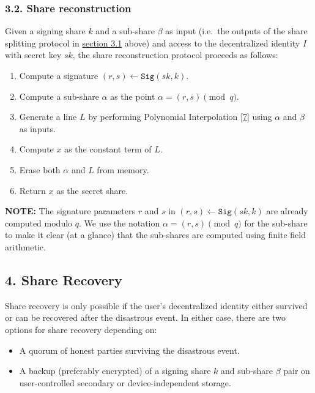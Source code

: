 \documentclass[
]{article}
\providecommand{\tightlist}{%
  \setlength{\itemsep}{0pt}\setlength{\parskip}{0pt}}
\begin{document}
\hypertarget{share-reconstruction}{%
\subsubsection{3.2. Share reconstruction}\label{share-reconstruction}}

Given a signing share \(k\) and a sub-share \(\beta\) as input (i.e.~the
outputs of the share splitting protocol in
\protect\hyperlink{share-splitting}{section 3.1} above) and access to
the decentralized identity \(I\) with secret key \(sk\), the share
reconstruction protocol proceeds as follows:

\begin{enumerate}
\def\labelenumi{\arabic{enumi}.}
\tightlist
\item
  Compute a signature \((r, s) \leftarrow \mathtt{Sig}(sk, k)\).
\item
  Compute a sub-share \(\alpha\) as the point
  \(\alpha = (r, s) \pmod q\).
\item
  Generate a line \(L\) by performing Polynomial Interpolation
  {[}\protect\hyperlink{ref-wiki:interpolation}{7}{]} using \(\alpha\)
  and \(\beta\) as inputs.
\item
  Compute \(x\) as the constant term of \(L\).
\item
  Erase both \(\alpha\) and \(L\) from memory.
\item
  Return \(x\) as the secret share.
\end{enumerate}

\textbf{NOTE:} The signature parameters \(r\) and \(s\) in
\((r, s) \leftarrow \mathtt{Sig}(sk, k)\) are already computed modulo
\(q\). We use the notation \(\alpha = (r, s) \pmod q\) for the sub-share
to make it clear (at a glance) that the sub-shares are computed using
finite field arithmetic.

\hypertarget{share-recovery}{%
\subsection{4. Share Recovery}\label{share-recovery}}

Share recovery is only possible if the user's decentralized identity
either survived or can be recovered after the disastrous event. In
either case, there are two options for share recovery depending on:

\begin{itemize}
\tightlist
\item
  A quorum of honest parties surviving the disastrous event.
\item
  A backup (preferably encrypted) of a signing share \(k\) and sub-share
  \(\beta\) pair on user-controlled secondary or device-independent
  storage.
\end{itemize}
\end{document}
